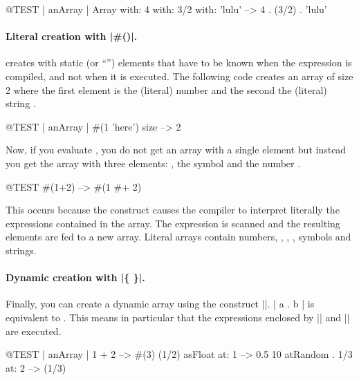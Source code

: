 \documentclass[a4paper,10pt,twoside]{book}
\begin{document}
\begin{code}{@TEST | anArray |}
Array with: 4 with: 3/2 with: 'lulu' -->  {4 . (3/2) . 'lulu'}
\end{code}

\paragraph{Literal creation with \ct|\#()|.}
\ct{#()} creates  with static (or ``'') elements that have to be known when the expression is compiled, and not when it is executed. The following code creates an array of size 2 where the first element is the (literal) number  and the second the (literal) string .


\begin{code}{@TEST | anArray |}
#(1 'here') size --> 2
\end{code}

Now, if you evaluate , you do not get an array with a single element  but instead you get the array  \ie with three elements: , the symbol \ct{#+} and the number .

\begin{code}{@TEST}
#(1+2) -->  #(1 #+ 2)
\end{code}

\noindent
This occurs because the construct \ct{#()} causes the compiler to interpret literally the expressions contained in the array. The expression is scanned and the resulting elements are fed to a new array. Literal arrays contain numbers, , , , symbols and strings.

\paragraph{Dynamic creation with \ct|\{ \}|.}
Finally, you can create a dynamic array using the construct \ct|{}|. \ct|{ a . b }| is equivalent to . This means in particular that the expressions enclosed by \ct|{| and \ct|}| are executed. 

\begin{code}{@TEST | anArray |}
{ 1 + 2 } --> #(3)
{(1/2) asFloat} at: 1 --> 0.5
{10 atRandom . 1/3} at: 2 --> (1/3)
\end{code}
\end{document}
